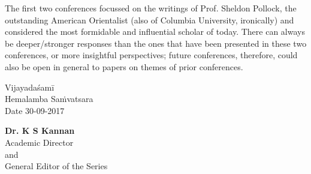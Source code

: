The first two conferences focussed on the writings of Prof. Sheldon Pollock, the outstanding American Orientalist (also of Columbia University, ironically) and considered the most formidable and influential scholar of today. There can always be deeper/stronger responses than the ones that have been presented in these two conferences, or more insightful perspectives; future conferences, therefore, could also be open in general to papers on themes of prior conferences.

 Vijayadaśamī\\
 Hemalamba Saṁvatsara\\
 Date 30-09-2017\\

\begin{flushright}
 \textbf{Dr. K S Kannan}\\
 Academic Director\\
 and\\
 General Editor of the Series
\end{flushright}

